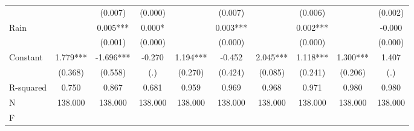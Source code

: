 {\begin{tabular}{l*{9}{c}}
                    &               &     (0.007)   &     (0.000)   &               &     (0.007)   &               &     (0.006)   &               &     (0.002)   \\
Rain                &               &       0.005***&       0.000*  &               &       0.003***&               &       0.002***&               &      -0.000   \\
                    &               &     (0.001)   &     (0.000)   &               &     (0.000)   &               &     (0.000)   &               &     (0.000)   \\
Constant            &       1.779***&      -1.696***&      -0.270   &       1.194***&      -0.452   &       2.045***&       1.118***&       1.300***&       1.407   \\
                    &     (0.368)   &     (0.558)   &         (.)   &     (0.270)   &     (0.424)   &     (0.085)   &     (0.241)   &     (0.206)   &         (.)   \\
\hline
R-squared           &       0.750   &       0.867   &       0.681   &       0.959   &       0.969   &       0.968   &       0.971   &       0.980   &       0.980   \\
N                   &     138.000   &     138.000   &     138.000   &     138.000   &     138.000   &     138.000   &     138.000   &     138.000   &     138.000   \\
F                   &               &               &               &               &               &               &               &               &               \\
\hline\hline
\end{tabular}
}

